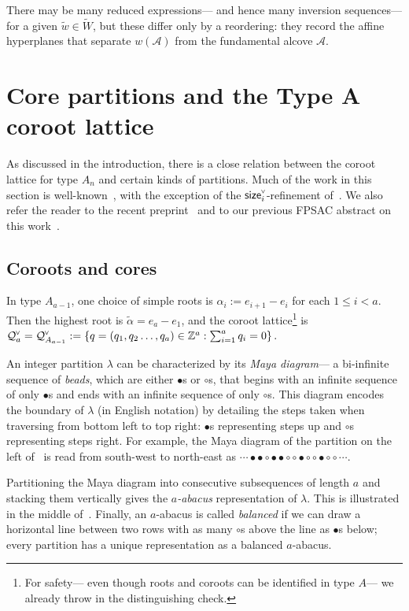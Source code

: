 \documentclass[ALCO,published]{cedram}
\newcommand{\darkblue}{\color{darkblue}} %
\newcommand{\defn}[1]{\emph{\darkblue #1}}
\newcommand{\chk}[1]{#1^{\normalfont\smash{\scalebox{.5}[.5]{\rotatebox{90}{\textbf{\textless}}}}}}
\newcommand{\wa}{\widetilde{W}}
\newcommand{\Q}{\mathcal{Q}}
\newcommand{\ac}{\mathcal{A}}
\newcommand{\waf}{\widetilde{w}}
\newcommand{\size}{{\sf size}}
\begin{document}
There may be many reduced expressions--- and hence many inversion sequences--- for a given $\waf\in\wa$, but these differ only by a reordering: they record the affine hyperplanes that separate $w(\ac)$ from the fundamental alcove $\ac$. 





\section{Core partitions and the Type A coroot lattice}

As discussed in the introduction, there is a close relation between the coroot lattice for type $A_n$ and certain kinds of partitions. Much of the work in this section is well-known~\cite{armstrong2014results,fishel2010bijection,thiel2017strange}, with the exception of the $\chk{\size}_i$-refinement of~.  We also refer the reader to the recent preprint~\cite{chapelier2022atomic} and to our previous FPSAC abstract on this work~\cite{stucky85strange}.

\subsection{Coroots and cores}
\label{sec:abaci}
In type $A_{a-1}$, one choice of simple roots is $\alpha_i:=e_{i+1}-e_{i}$ for each $1\leq i < a$. Then the highest root is $\widetilde{\alpha}=e_a-e_1$, and the coroot lattice\footnote{For safety--- even though roots and coroots can be identified in type $A$--- we already throw in the distinguishing check.} is
$\chk{\Q}_{a} = \chk{\Q}_{A_{a-1}} := \left\{q=(q_1,q_2\ldots,q_a) \in \mathbb{Z}^a : \sum_{i=1}^a q_i = 0 \right\}.$

An integer partition $\lambda$ can be characterized by its \defn{Maya diagram}--- a bi-infinite sequence of \defn{beads}, which are either $\bullet$s or $\circ$s, that begins with an infinite sequence of only $\bullet$s and ends with an infinite sequence of only $\circ$s. This diagram encodes the boundary of $\lambda$ (in English notation) by detailing the steps taken when traversing from bottom left to top right: $\bullet$s representing steps up and $\circ$s representing steps right.  For example, the Maya diagram of the partition on the left of~ is read from south-west to north-east as $\cdots\bullet\bullet\circ\bullet\bullet\circ\circ\bullet\circ\circ\bullet\circ\circ\cdots$.

Partitioning the Maya diagram into consecutive subsequences of length $a$ and stacking them vertically gives the \defn{$a$-abacus} representation of $\lambda$.  This is illustrated in the middle of~.  Finally, an $a$-abacus is called \defn{balanced} if we can draw a horizontal line between two rows with as many $\circ$s above the line as $\bullet$s below; every partition has a unique representation as a balanced $a$-abacus. 
\end{document}

